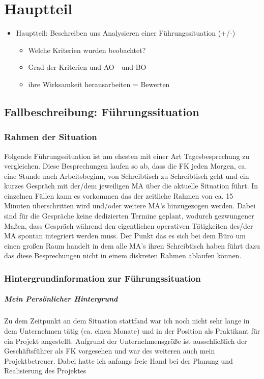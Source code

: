 \chapter{Hauptteil}
\label{chap:hauptteil}

\begin{itemize}
\item Hauptteil: Beschreiben uns Analysieren einer Führungssituation (+/-)
\begin{itemize}
\item Welche Kriterien wurden beobachtet?
\item Grad der Kriterien und \ac{AO} - und \ac{BO}
\item ihre Wirksamkeit herausarbeiten = Bewerten
\end{itemize}
\end{itemize}



\section{Fallbeschreibung: Führungssituation}

\subsection*{Rahmen der Situation}
Folgende Führungssituation ist am ehesten mit einer Art Tagesbesprechung zu vergleichen.
Diese Besprechungen laufen so ab, dass die \ac{FK} jeden Morgen, ca. eine Stunde nach Arbeitsbeginn, von Schreibtisch zu Schreibtisch geht und ein kurzes Gespräch   mit der/dem jeweiligen \ac{MA} über die aktuelle Situation führt. 
In einzelnen Fällen kann es vorkommen das der zeitliche Rahmen von ca. 15 Minuten überschritten wird und/oder weitere \ac{MA}'s hinzugezogen werden.
Dabei sind für die Gespräche keine dedizierten Termine geplant, wodurch gezwungener Maßen, dass Gespräch während den eigentlichen operativen Tätigkeiten des/der \ac{MA} spontan integriert werden muss. 
Der Punkt das es sich bei dem Büro um einen großen Raum handelt in dem alle \ac{MA}'s ihren Schreibtisch haben führt dazu das diese Besprechungen nicht in einem diskreten Rahmen ablaufen können.

\subsection*{Hintergrundinformation zur Führungssituation}

\paragraph*{Mein Persönlicher Hintergrund}
Zu dem Zeitpunkt an dem Situation stattfand war ich noch nicht sehr lange in dem Unternehmen tätig (ca. einen Monate) und in der Position als Praktikant für ein  Projekt angestellt. 
Aufgrund der Unternehmensgröße ist ausschließlich der Geschäftsführer als \ac{FK} vorgesehen und war des weiteren auch mein Projektbetreuer. 
Dabei hatte ich anfangs freie Hand bei der Planung und Realisierung des Projektes 

